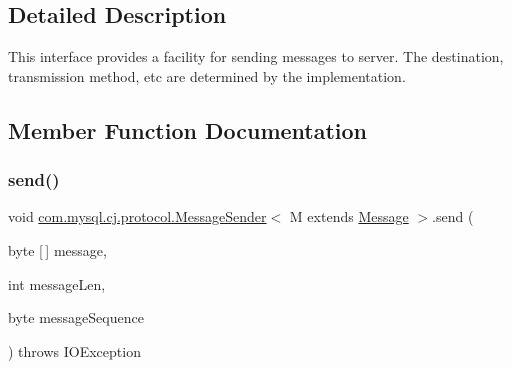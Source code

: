 \subsection{Detailed Description}
This interface provides a facility for sending messages to server. The destination, transmission method, etc are determined by the implementation. 

\subsection{Member Function Documentation}
\mbox{\label{interfacecom_1_1mysql_1_1cj_1_1protocol_1_1_message_sender_a0c7192449eae4aa0f0dbbc9778dac002}} 
\subsubsection{\texorpdfstring{send()}{send()}\hspace{0.1cm}{\footnotesize\ttfamily [1/2]}}
{\footnotesize\ttfamily void \mbox{\hyperlink{interfacecom_1_1mysql_1_1cj_1_1protocol_1_1_message_sender}{com.\+mysql.\+cj.\+protocol.\+Message\+Sender}}$<$ M extends \mbox{\hyperlink{interfacecom_1_1mysql_1_1cj_1_1protocol_1_1_message}{Message}} $>$.send (\begin{DoxyParamCaption}\item[{byte \mbox{[}$\,$\mbox{]}}]{message,  }\item[{int}]{message\+Len,  }\item[{byte}]{message\+Sequence }\end{DoxyParamCaption}) throws I\+O\+Exception}



